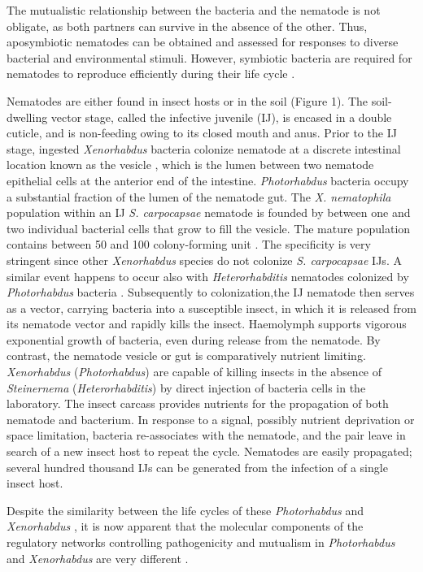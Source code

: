 \documentclass[10pt]{article}
\newcommand{\Xnema}{\textit{X. nematophila} }
\newcommand{\Scarpo}{\textit{S. carpocapsae} }
\newcommand{\Xeno}{\textit{Xenorhabdus} }
\newcommand{\Stein}{\textit{Steinernema} }
\newcommand{\Photo}{\textit{Photorhabdus} }
\newcommand{\Hetero}{\textit{Heterorhabditis} }
\begin{document}
\begin{multicols}{2}
The mutualistic relationship between the bacteria and the nematode is not obligate, as both partners can survive in the absence of the other. 
Thus, aposymbiotic nematodes can be obtained and assessed for responses to diverse bacterial and environmental stimuli. 
However, symbiotic bacteria are required for nematodes to reproduce efficiently during their life cycle \cite{Sicard2003}. 

Nematodes are either found in insect hosts or in the soil (Figure 1). 
The soil-dwelling vector stage, called the infective juvenile (IJ), is encased in a double cuticle, and is non-feeding owing to its closed mouth and anus.
Prior to the IJ stage, ingested \Xeno bacteria colonize nematode at a discrete intestinal location known as the vesicle \cite{Chapuis2009}, which is the lumen between two nematode epithelial cells at the anterior end of the intestine.
\Photo bacteria occupy a substantial fraction of the lumen of the nematode gut\cite{Goodrich-Blair2007}. 
The \Xnema population within an IJ \Scarpo nematode is founded by between one and two individual bacterial cells that grow to fill the vesicle.  
The mature population contains between 50 and 100 colony-forming unit \cite{Martens}. 
The specificity is very stringent since other \Xeno species do not colonize \Scarpo IJs. 
A similar event happens to occur also with \Hetero nematodes colonized by \Photo bacteria \cite{Somvanshi2012}.
Subsequently to colonization,the IJ nematode then serves as a vector, carrying bacteria into a susceptible insect, in which it is released from its nematode vector and rapidly kills the insect.
Haemolymph supports vigorous exponential growth \cite{Somvanshi2012} of bacteria, even during release from the nematode. 
By contrast, the nematode vesicle or gut is comparatively nutrient limiting. 
\Xeno (\textit{Photorhabdus}) are capable of killing insects in the absence of \Stein (\textit{Heterorhabditis}) by direct injection of bacteria cells in the laboratory.  
The insect carcass provides nutrients for the propagation of both nematode and bacterium. 
In response to a signal, possibly nutrient deprivation or space limitation, bacteria re-associates with the nematode, and the pair leave in search of a new insect host to repeat the cycle.
Nematodes are easily propagated; several hundred thousand IJs can be generated from the infection of a single insect host.

Despite the similarity between the life cycles of these \Photo and \Xeno, it is now apparent that the molecular components of the regulatory networks controlling pathogenicity and mutualism in \Photo and \Xeno are very different \cite{Goodrich-Blair2007}.


\end{multicols}
\end{document}
